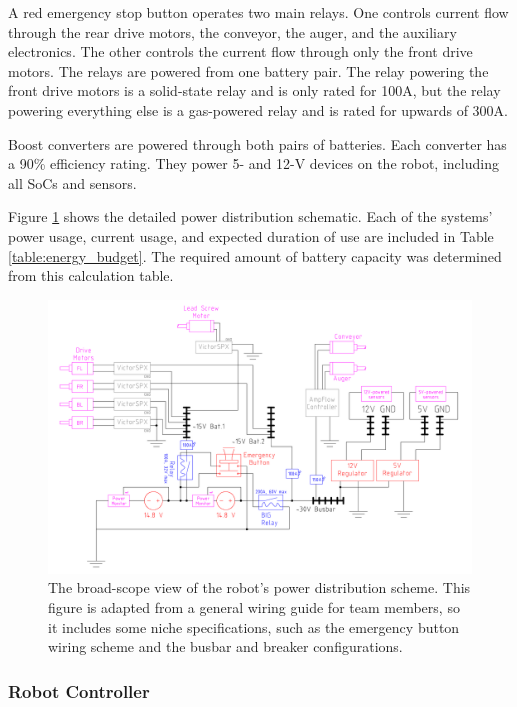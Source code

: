 \documentclass[class=article, crop=false]{standalone}
\begin{document}
	A red emergency stop button operates two main relays. One controls current flow through the rear drive motors, the conveyor, the auger, and the auxiliary electronics. The other controls the current flow through only the front drive motors. The relays are powered from one battery pair. The relay powering the front drive motors is a solid-state relay and is only rated for 100A, but the relay powering everything else is a gas-powered relay and is rated for upwards of 300A. 

	Boost converters are powered through both pairs of batteries. Each converter has a 90\% efficiency rating. They power 5- and 12-V devices on the robot, including all SoCs and sensors.
	
	Figure \ref{fig:power-dist} shows the detailed power distribution schematic. Each of the systems’ power usage, current usage, and expected duration of use are included in Table \ref{table:energy_budget}. The required amount of battery capacity was determined from this calculation table. 
	
	\FloatBarrier
	\begin{figure}[h]
	\centering
	 \includegraphics[width=1\linewidth]{09_Figures/power-distribution.jpg}
	 \caption{The broad-scope view of the robot’s power distribution scheme. This figure is adapted from a general wiring guide for team members, so it includes some niche specifications, such as the emergency button wiring scheme and the busbar and breaker configurations.}
	 \label{fig:power-dist}
	\end{figure}
	\FloatBarrier
	
	
	\subsubsection{Robot Controller}
	
\end{document}
